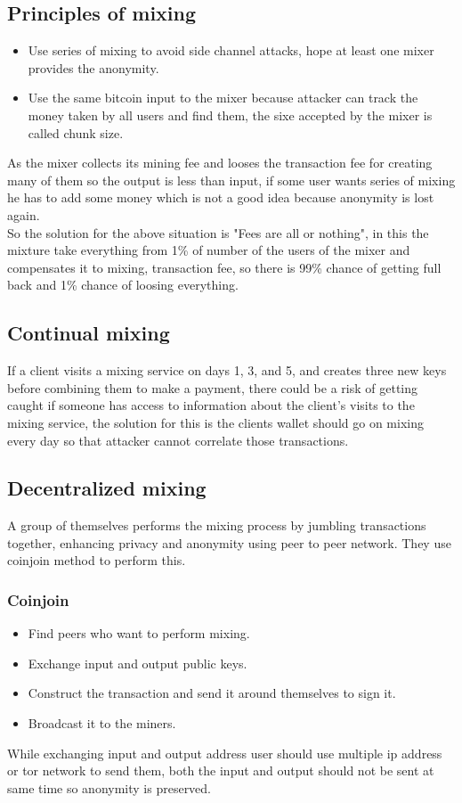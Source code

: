 \documentclass{article}
\begin{document}
\subsection{Principles of mixing}
\begin{itemize}
    \item Use series of mixing to avoid side channel attacks, hope at least one mixer provides the anonymity.
    \item Use the same bitcoin input to the mixer because attacker can track the money taken by all users and find them, the sixe accepted by the mixer is called chunk size.
\end{itemize}
As the mixer collects its mining fee and looses the transaction fee for creating many of them so the output is less than input, if some user wants series of mixing he has to add some money which is not a good idea because anonymity is lost again.\\
So the solution for the above situation is "Fees are all or nothing", in this the mixture take everything from 1\% of number of the users of the mixer and compensates it to mixing, transaction fee, so there is 99\% chance of getting full back and 1\% chance of loosing everything.
\subsection{Continual mixing}
If a client visits a mixing service on days 1, 3, and 5, and creates three new keys before combining them to make a payment, there could be a risk of getting caught if someone has access to information about the client's visits to the mixing service, the solution for this is the clients wallet should go on mixing every day so that attacker cannot correlate those transactions.
\subsection{Decentralized mixing}
A group of themselves performs the mixing process by jumbling transactions together, enhancing privacy and anonymity using peer to peer network. They use coinjoin method to perform this.
\subsubsection{Coinjoin}
\begin{itemize}
    \item Find peers who want to perform mixing.
    \item Exchange input and output public keys.
    \item Construct the transaction and send it around themselves to sign it.
    \item Broadcast it to the miners.
\end{itemize}
While exchanging input and output address user should use multiple ip address or tor network to send them, both the input and output should not be sent at same time so anonymity is preserved.
\end{document}
